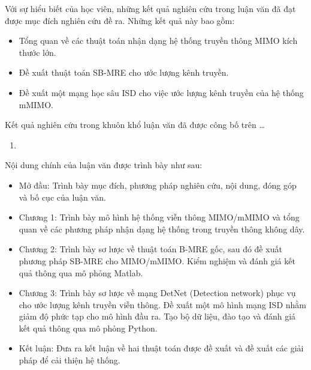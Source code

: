 
Với sự hiểu biết của học viên, những kết quả nghiên cứu trong luận văn đã đạt được mục đích nghiên cứu đề ra. Những kết quả này bao gồm:

\renewcommand{\labelitemi}{$-$}
\begin{itemize}
	\item Tổng quan về các thuật toán nhận dạng hệ thống truyền thông MIMO kích thước lớn.
	\item Đề xuất thuật toán SB-MRE cho ước lượng kênh truyền.
	\item Đề xuất một mạng học sâu ISD cho việc ước lượng kênh truyền của hệ thống mMIMO.
\end{itemize} 

Kết quả nghiên cứu trong khuôn khổ luận văn đã được công bố trên \ldots
\begin{enumerate}
    \item 
\end{enumerate}

\vspace{0.5cm}

Nội dung chính của luận văn được trình bày như sau:

\renewcommand{\labelitemi}{$-$}
\begin{itemize}
	\item Mở đầu: Trình bày mục đích, phương pháp nghiên cứu, nội dung, đóng góp và bố cục của luận văn.
	\item Chương 1: Trình bày mô hình hệ thống viễn thông MIMO/mMIMO và tổng quan về các phương pháp nhận dạng hệ thống trong truyền thông không dây.
	\item Chương 2: Trình bày sơ lược về thuật toán B-MRE gốc, sau đó đề xuất phương pháp SB-MRE cho MIMO/mMIMO. Kiểm nghiệm và đánh giá kết quả thông qua mô phỏng Matlab.
	\item Chương 3: Trình bày sơ lược về mạng DetNet (Detection network) phục vụ cho ước lượng kênh truyền viễn thông. Đề xuất một mô hình mạng ISD nhằm giảm độ phức tạp cho mô hình đầu ra. Tạo bộ dữ liệu, đào tạo và đánh giá kết quả thông qua mô phỏng Python.
	\item Kết luận: Đưa ra kết luận về hai thuật toán được đề xuất và đề xuất các giải pháp để cải thiện hệ thống.
\end{itemize} 